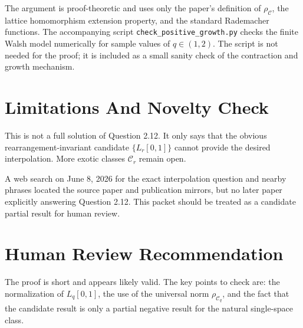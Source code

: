 \documentclass[11pt]{article}
\newcommand{\calC}{\mathcal C}
\begin{document}
The argument is proof-theoretic and uses only the paper's definition of
\(\rho_{\calC}\), the lattice homomorphism extension property, and the
standard Rademacher functions. The accompanying script
\texttt{check\_positive\_growth.py} checks the finite Walsh model
numerically for sample values of \(q\in(1,2)\). The script is not needed
for the proof; it is included as a small sanity check of the contraction
and growth mechanism.

\section*{Limitations And Novelty Check}

This is not a full solution of Question 2.12. It only says that the
obvious rearrangement-invariant candidate \(\{L_r[0,1]\}\) cannot provide
the desired interpolation. More exotic classes \(\calC_r\) remain open.

A web search on June 8, 2026 for the exact interpolation question and
nearby phrases located the source paper and publication mirrors, but no
later paper explicitly answering Question 2.12. This packet should be
treated as a candidate partial result for human review.

\section*{Human Review Recommendation}

The proof is short and appears likely valid. The key points to check are:
the normalization of \(L_q[0,1]\), the use of the universal norm
\(\rho_{\calC_q}\), and the fact that the candidate result is only a
partial negative result for the natural single-space class.
\end{document}

